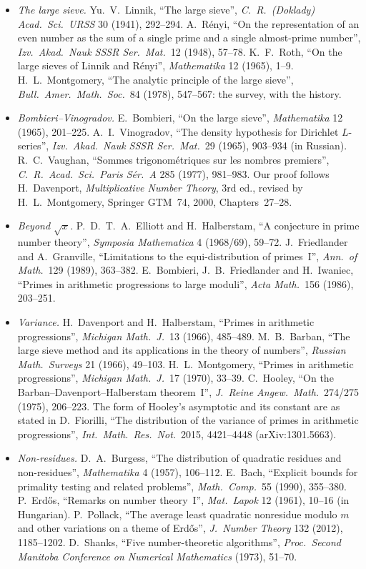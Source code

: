 \begin{itemize}
\item \emph{The large sieve.} Yu.~V.~Linnik, ``The large sieve'', \emph{C.\ R.\ (Doklady) Acad.\ Sci.\ URSS} 30 (1941), 292--294. A.~Rényi, ``On the representation of an even number as the sum of a single prime and a single almost-prime number'', \emph{Izv.\ Akad.\ Nauk SSSR Ser.\ Mat.}\ 12 (1948), 57--78. K.~F.~Roth, ``On the large sieves of Linnik and Rényi'', \emph{Mathematika} 12 (1965), 1--9. H.~L.~Montgomery, ``The analytic principle of the large sieve'', \emph{Bull.\ Amer.\ Math.\ Soc.}\ 84 (1978), 547--567: the survey, with the history.
\item \emph{Bombieri--Vinogradov.} E.~Bombieri, ``On the large sieve'', \emph{Mathematika} 12 (1965), 201--225. A.~I.~Vinogradov, ``The density hypothesis for Dirichlet $L$-series'', \emph{Izv.\ Akad.\ Nauk SSSR Ser.\ Mat.}\ 29 (1965), 903--934 (in Russian). R.~C.~Vaughan, ``Sommes trigonométriques sur les nombres premiers'', \emph{C.\ R.\ Acad.\ Sci.\ Paris Sér.\ A} 285 (1977), 981--983. Our proof follows H.~Davenport, \emph{Multiplicative Number Theory}, 3rd ed., revised by H.~L.~Montgomery, Springer GTM~74, 2000, Chapters~27--28.
\item \emph{Beyond $\sqrt x$.} P.~D.~T.~A.~Elliott and H.~Halberstam, ``A conjecture in prime number theory'', \emph{Symposia Mathematica} 4 (1968/69), 59--72. J.~Friedlander and A.~Granville, ``Limitations to the equi-distribution of primes~I'', \emph{Ann.\ of Math.}\ 129 (1989), 363--382. E.~Bombieri, J.~B.~Friedlander and H.~Iwaniec, ``Primes in arithmetic progressions to large moduli'', \emph{Acta Math.}\ 156 (1986), 203--251.
\item \emph{Variance.} H.~Davenport and H.~Halberstam, ``Primes in arithmetic progressions'', \emph{Michigan Math.\ J.}\ 13 (1966), 485--489. M.~B.~Barban, ``The large sieve method and its applications in the theory of numbers'', \emph{Russian Math.\ Surveys} 21 (1966), 49--103. H.~L.~Montgomery, ``Primes in arithmetic progressions'', \emph{Michigan Math.\ J.}\ 17 (1970), 33--39. C.~Hooley, ``On the Barban--Davenport--Halberstam theorem~I'', \emph{J.\ Reine Angew.\ Math.}\ 274/275 (1975), 206--223. The form of Hooley's asymptotic and its constant are as stated in D.~Fiorilli, ``The distribution of the variance of primes in arithmetic progressions'', \emph{Int.\ Math.\ Res.\ Not.}\ 2015, 4421--4448 (arXiv:1301.5663).
\item \emph{Non-residues.} D.~A.~Burgess, ``The distribution of quadratic residues and non-residues'', \emph{Mathematika} 4 (1957), 106--112. E.~Bach, ``Explicit bounds for primality testing and related problems'', \emph{Math.\ Comp.}\ 55 (1990), 355--380. P.~Erdős, ``Remarks on number theory~I'', \emph{Mat.\ Lapok} 12 (1961), 10--16 (in Hungarian). P.~Pollack, ``The average least quadratic nonresidue modulo $m$ and other variations on a theme of Erdős'', \emph{J.\ Number Theory} 132 (2012), 1185--1202. D.~Shanks, ``Five number-theoretic algorithms'', \emph{Proc.\ Second Manitoba Conference on Numerical Mathematics} (1973), 51--70.

\end{itemize}
